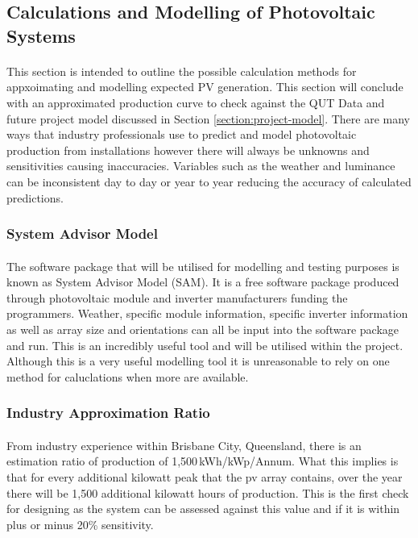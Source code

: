 
\subsection{Calculations and Modelling of Photovoltaic Systems} \label{section:PV-Calculations}

\paragraph{}
This section is intended to outline the possible calculation methods for appxoimating and modelling expected PV generation. This section will conclude with an approximated production curve to check against the QUT Data and future project model discussed in Section \ref{section:project-model}. There are many ways that industry professionals use to predict and model photovoltaic production from installations however there will always be unknowns and sensitivities causing inaccuracies. Variables such as the weather and luminance can be inconsistent day to day or year to year reducing the accuracy of calculated predictions.

\subsubsection{System Advisor Model}

\paragraph{}
The software package that will be utilised for modelling and testing purposes is known as System Advisor Model (SAM). It is a free software package produced through photovoltaic module and inverter manufacturers funding the programmers. Weather, specific module information, specific inverter information as well as array size and orientations can all be input into the software package and run. This is an incredibly useful tool and will be utilised within the project. Although this is a very useful modelling tool it is unreasonable to rely on one method for caluclations when more are available. 

\subsubsection{Industry Approximation Ratio}

\paragraph{}
From industry experience within Brisbane City, Queensland, there is an estimation ratio of production of 1,500\,kWh/kWp/Annum. What this implies is that for every additional kilowatt peak that the pv array contains, over the year there will be 1,500 additional kilowatt hours of production. This is the first check for designing as the system can be assessed against this value and if it is within plus or minus 20\% sensitivity.  

